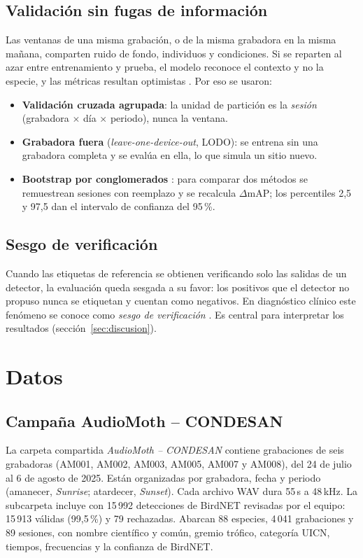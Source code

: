 \documentclass[11pt,a4paper]{article}
\begin{document}
\subsection{Validación sin fugas de información}
Las ventanas de una misma grabación, o de la misma grabadora en la misma mañana, comparten ruido de fondo, individuos y condiciones.
Si se reparten al azar entre entrenamiento y prueba, el modelo reconoce el contexto y no la especie, y las métricas resultan optimistas
\citep{kaufman2012leakage,roberts2017cv}. Por eso se usaron:
\begin{itemize}
  \item \textbf{Validación cruzada agrupada}: la unidad de partición es la \emph{sesión} (grabadora $\times$ día $\times$ periodo), nunca la ventana.
  \item \textbf{Grabadora fuera} (\emph{leave-one-device-out}, LODO): se entrena sin una grabadora completa y se evalúa en ella, lo que simula un sitio nuevo.
  \item \textbf{Bootstrap por conglomerados} \citep{efron1993bootstrap}: para comparar dos métodos se remuestrean sesiones con reemplazo y se
        recalcula $\Delta\mathrm{mAP}$; los percentiles 2,5 y 97,5 dan el intervalo de confianza del 95\,\%.
\end{itemize}

\subsection{Sesgo de verificación}\label{sec:sesgo}
Cuando las etiquetas de referencia se obtienen verificando solo las salidas de un detector, la evaluación queda sesgada a su favor:
los positivos que el detector no propuso nunca se etiquetan y cuentan como negativos. En diagnóstico clínico este fenómeno se conoce
como \emph{sesgo de verificación} \citep{begg1983verification}. Es central para interpretar los resultados (sección~\ref{sec:discusion}).

\section{Datos}
\subsection{Campaña AudioMoth -- CONDESAN}
La carpeta compartida \emph{AudioMoth -- CONDESAN} contiene grabaciones de seis grabadoras (AM001, AM002, AM003, AM005, AM007 y AM008),
del 24 de julio al 6 de agosto de 2025. Están organizadas por grabadora, fecha y periodo (amanecer, \emph{Sunrise}; atardecer, \emph{Sunset}).
Cada archivo WAV dura 55\,s a 48\,kHz. La subcarpeta  incluye  con 15\,992 detecciones de BirdNET revisadas
por el equipo: 15\,913 válidas (99,5\,\%) y 79 rechazadas. Abarcan 88 especies, 4\,041 grabaciones y 89 sesiones, con nombre científico y común,
gremio trófico, categoría UICN, tiempos, frecuencias y la confianza de BirdNET.
\end{document}

